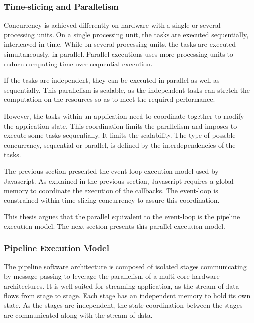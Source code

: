 \subsubsection{Time-slicing and Parallelism}

Concurrency is achieved differently on hardware with a single or several processing units.
On a single processing unit, the tasks are executed sequentially, interleaved in time.
While on several processing units, the tasks are executed simultaneously, in parallel.
Parallel executions uses more processing units to reduce computing time over sequential execution.

If the tasks are independent, they can be executed in parallel as well as sequentially.
This parallelism is scalable, as the independent tasks can stretch the computation on the resources so as to meet the required performance.

However, the tasks within an application need to coordinate together to modify the application state.
This coordination limits the parallelism and imposes to execute some tasks sequentially.
It limits the scalability.
The type of possible concurrency, sequential or parallel, is defined by the interdependencies of the tasks.

The previous section presented the event-loop execution model used by Javascript.
As explained in the previous section, Javascript requires a global memory to coordinate the execution of the callbacks.
The event-loop is constrained within time-slicing concurrency to assure this coordination.

This thesis argues that the parallel equivalent to the event-loop is the pipeline execution model.
The next section presents this parallel execution model.

\subsubsection{Pipeline Execution Model}

The pipeline software architecture is composed of isolated stages communicating by message passing to leverage the parallelism of a multi-core hardware architectures.
It is well suited for streaming application, as the stream of data flows from stage to stage.
Each stage has an independent memory to hold its own state.
As the stages are independent, the state coordination between the stages are communicated along with the stream of data.


